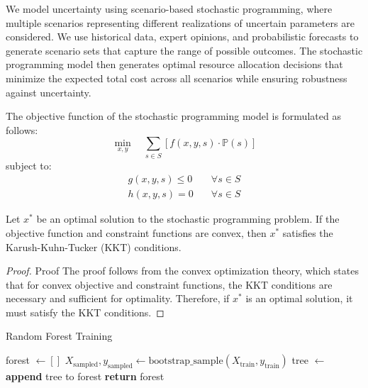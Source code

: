 \documentclass[deca,sglanonrev]{informs4}
\begin{document}
We model uncertainty using scenario-based stochastic programming, where multiple scenarios representing different realizations of uncertain parameters are considered. We use historical data, expert opinions, and probabilistic forecasts to generate scenario sets that capture the range of possible outcomes. The stochastic programming model then generates optimal resource allocation decisions that minimize the expected total cost across all scenarios while ensuring robustness against uncertainty.

The objective function of the stochastic programming model is formulated as follows:
\begin{equation*}
\min_{x,y} \quad \sum_{s \in S} \left[ f(x, y, s) \cdot \mathbb{P}(s) \right]
\end{equation*}
subject to:
\begin{align}
g(x, y, s) \leq 0 &\quad \forall s \in S\\
h(x, y, s) = 0 &\quad \forall s \in S
\end{align}

\begin{theorem}\label{thm:Opt}
Let $x^*$ be an optimal solution to the stochastic programming problem. If the objective function and constraint functions are convex, then $x^*$ satisfies the Karush-Kuhn-Tucker (KKT) conditions.
\end{theorem}

\begin{proof}{Proof}
The proof follows from the convex optimization theory, which states that for convex objective and constraint functions, the KKT conditions are necessary and sufficient for optimality. Therefore, if $x^*$ is an optimal solution, it must satisfy the KKT conditions.\Halmos
\end{proof}

\begin{algorithm}
\caption{Random Forest Training}
\vskip6pt
\begin{algorithmic}
    \State forest $\gets []$
        \State $X_{\text{sampled}}, y_{\text{sampled}} \gets \text{bootstrap\_sample}(X_{\text{train}}, y_{\text{train}})$
        \State tree $\gets$ 
        \State \textbf{append} tree to forest
    \EndFor
    \State \textbf{return} forest
\EndProcedure
\Statex
\end{algorithmic}
\end{algorithm}
\end{document}
